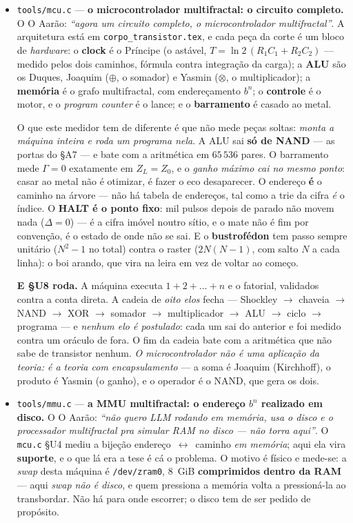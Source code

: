 \documentclass[11pt]{article}
\newcommand{\code}[1]{\texttt{\small #1}}
\theoremstyle{plain}
\theoremstyle{remark}
\begin{document}
\begin{itemize}
\item \code{tools/mcu.c} --- \textbf{o microcontrolador multifractal: o circuito completo.} O
O Aarão: \emph{``agora um circuito completo, o microcontrolador multifractal''}. A arquitetura está em
\code{corpo\_transistor.tex}, e cada peça da corte é um bloco de \emph{hardware}: o \textbf{clock} é
o Príncipe (o astável, $T=\ln2\,(R_1C_1+R_2C_2)$ --- medido pelos dois caminhos, fórmula contra
integração da carga); a \textbf{ALU} são os Duques, Joaquim ($\oplus$, o somador) e Yasmin
($\otimes$, o multiplicador); a \textbf{memória} é o grafo multifractal, com endereçamento $b^n$; o
\textbf{controle} é o motor, e o \emph{program counter} é o lance; e o \textbf{barramento} é casado
ao metal.

O que este medidor tem de diferente é que não mede peças soltas: \emph{monta a máquina inteira e
roda um programa nela}. A ALU sai \textbf{só de NAND} --- as portas do §A7 --- e bate com a
aritmética em $65\,536$ pares. O barramento mede $\Gamma=0$ exatamente em $Z_L=Z_0$, e o
\emph{ganho máximo cai no mesmo ponto}: casar ao metal não é otimizar, é fazer o eco desaparecer. O
endereço \textbf{é} o caminho na árvore --- não há tabela de endereços, tal como a trie da cifra
\emph{é} o índice. O \textbf{HALT é o ponto fixo}: mil pulsos depois de parado não movem nada
($\Delta=0$) --- é a cifra imóvel noutro sítio, e o mate não é fim por convenção, é o estado de onde
não se sai. E o \textbf{bustrofédon} tem passo sempre unitário ($N^2-1$ no total) contra o raster
($2N(N{-}1)$, com salto $N$ a cada linha): o boi arando, que vira na leira em vez de voltar ao
começo.

\textbf{E §U8 roda.} A máquina executa $1+2+\dots+n$ e o fatorial, validados contra a conta direta.
A cadeia de \emph{oito elos} fecha --- Shockley $\to$ chaveia $\to$ NAND $\to$ XOR $\to$ somador
$\to$ multiplicador $\to$ ALU $\to$ ciclo $\to$ programa --- e \emph{nenhum elo é postulado}: cada um
sai do anterior e foi medido contra um oráculo de fora. O fim da cadeia bate com a aritmética que
não sabe de transistor nenhum. \emph{O microcontrolador não é uma aplicação da teoria: é a teoria
com encapsulamento} --- a soma é Joaquim (Kirchhoff), o produto é Yasmin (o ganho), e o operador é o
NAND, que gera os dois.

\item \code{tools/mmu.c} --- \textbf{a MMU multifractal: o endereço $b^n$ realizado em disco.} O
O Aarão: \emph{``não quero LLM rodando em memória, usa o disco e o processador multifractal pra
simular RAM no disco --- não torra aqui''}. O \code{mcu.c} §U4 mediu a bijeção
endereço~$\leftrightarrow$~caminho \emph{em memória}; aqui ela vira \textbf{suporte}, e o que lá era
a tese é cá o problema. O motivo é físico e mede-se: a \emph{swap} desta máquina é
\code{/dev/zram0}, 8~GiB \textbf{comprimidos dentro da RAM} --- aqui \emph{swap não é disco}, e quem
pressiona a memória volta a pressioná-la ao transbordar. Não há para onde escorrer; o disco tem de
ser pedido de propósito.


\end{itemize}
\end{document}
